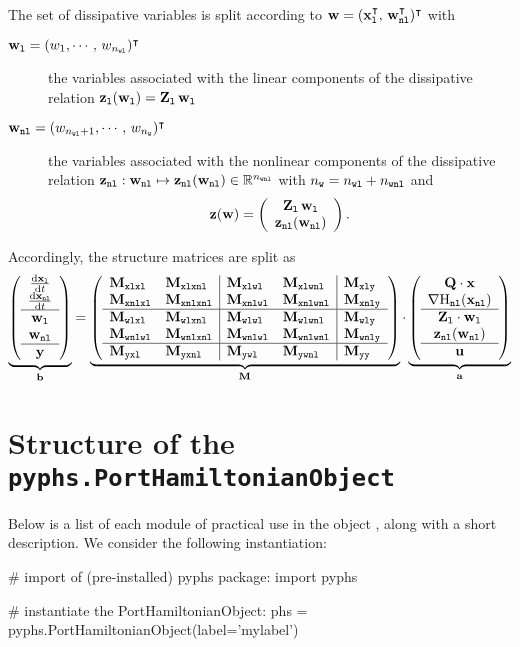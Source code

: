 \documentclass[10pt,a4paper]{article}
\begin{document}
%
The set of dissipative variables is split according to $\vw = (\vxl^\T, \, \vwnl^\T)^\T$ with 
%
\begin{description}
%
\item[$\vwl = (w_1,\cdots,\,w_\nwl)^\T$] the variables associated with the linear components of the dissipative relation $\vzl(\vwl)=\mat{Z}_{\lab l}\,\vwl$
%
\item[$\vwnl=(w_{\nwl+1},\cdots,\,w_\nw)^\T$] the variables associated with the nonlinear components of the dissipative relation $\vznl:\vwnl\mapsto\vznl(\vwnl)\in\RR^{\nwnl}$ with $\nw = \nwl+\nwnl$ and $$ \vz(\vw) = \left(\begin{array}{c}
\mat{Z}_{\lab l}\,\vwl\\
\vznl(\vwnl)
\end{array} \right).$$
%
\end{description}
%

Accordingly, the structure matrices are split as
%
\begin{equation}
\underbrace{\left(\begin{array}{c}
\D{\vxl}{t}\\
\D{\vxnl}{t}\\ \hline
\vwl\\
\vwnl\\ \hline
\vy
\end{array}\right)}_{\vec b}
 = \underbrace{\left(\begin{array}{ll|ll|l}
\M{xlxl}&\M{xlxnl}&\M{xlwl} & \M{xlwnl} & \M{xly}\\ 
\M{xnlxl}&\M{xnlxnl}&\M{xnlwl} &  \M{xnlwnl} & \M{xnly}\\ \hline
\M{wlxl}& \M{wlxnl}& \M{wlwl} & \M{wlwnl} & \M{wly}\\
\M{wnlwl}& \M{wnlxnl}& \M{wnlwl} & \M{wnlwnl} & \M{wnly}\\ \hline
\M{yxl} &\M{yxnl}&\M{ywl} & \M{ywnl} &\M{yy}
\end{array}\right)}_{\M{}}
\cdot
\underbrace{\left(\begin{array}{c}
\Q\cdot\vx\\
\nabla\Hnl(\vxnl)\\ \hline
\mat{Z}_{\lab l}\cdot\vwl\\
\vznl(\vwnl)\\ \hline
\vu
\end{array}\right) }_{\vec a}
\end{equation}
%
\tableofcontents
%
\section{Structure of the \texttt{pyphs.PortHamiltonianObject}}
%
Below is a list of each module of practical use in the object  , along with a short description. We consider the following instantiation:
%
\begin{python}
# import of (pre-installed) pyphs package:
import pyphs

# instantiate the PortHamiltonianObject:
phs = pyphs.PortHamiltonianObject(label='mylabel')
\end{python}
%
\end{document}
